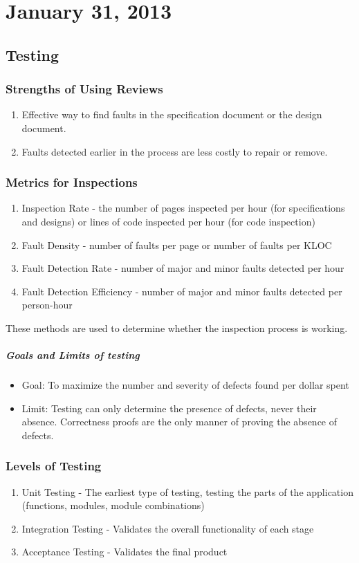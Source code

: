 \documentclass{report}
\begin{document}
	\chapter{January 31, 2013}
		\section{Testing}
			\subsection{Strengths of Using Reviews}
				\begin{enumerate}
					\item Effective way to find faults in the specification document or the design document.
					\item Faults detected earlier in the process are less costly to repair or remove.
				\end{enumerate}
			\subsection{Metrics for Inspections}
				\begin{enumerate}
					\item Inspection Rate - the number of pages inspected per hour (for specifications and designs) or lines of code inspected per hour (for code inspection)
					\item Fault Density - number of faults per page or number of faults per KLOC
					\item Fault Detection Rate - number of major and minor faults detected per hour
					\item Fault Detection Efficiency - number of major and minor faults detected per person-hour
				\end{enumerate}
				These methods are used to determine whether the inspection process is working.
			\paragraph{Goals and Limits of testing}
				\begin{itemize}
					\item Goal: To maximize the number and severity of defects found per dollar spent
					\item Limit: Testing can only determine the presence of defects, never their absence. Correctness proofs are the only manner of proving the absence of defects.
				\end{itemize}
			\subsection{Levels of Testing}
				\begin{enumerate}
					\item Unit Testing - The earliest type of testing, testing the parts of the application (functions, modules, module combinations)
					\item Integration Testing - Validates the overall functionality of each stage
					\item Acceptance Testing - Validates the final product
				\end{enumerate}
\end{document}
